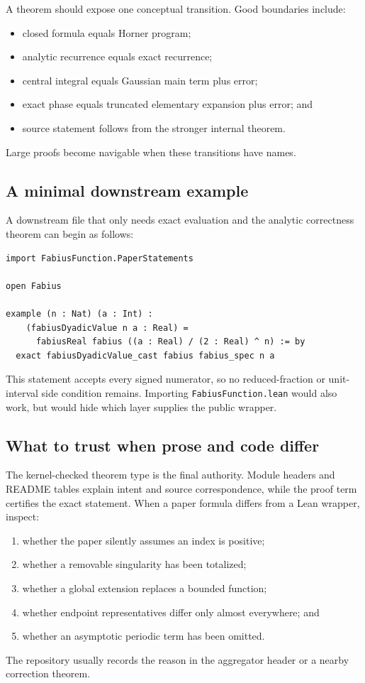 \documentclass[11pt,oneside]{article}
\theoremstyle{definition}
\theoremstyle{remark}
\begin{document}
A theorem should expose one conceptual transition.  Good boundaries include:
\begin{itemize}
  \item closed formula equals Horner program;
  \item analytic recurrence equals exact recurrence;
  \item central integral equals Gaussian main term plus error;
  \item exact phase equals truncated elementary expansion plus error; and
  \item source statement follows from the stronger internal theorem.
\end{itemize}
Large proofs become navigable when these transitions have names.

\subsection{A minimal downstream example}
A downstream file that only needs exact evaluation and the analytic correctness theorem can begin as follows:
\begin{lstlisting}[style=pseudo]
import FabiusFunction.PaperStatements

open Fabius

example (n : Nat) (a : Int) :
    (fabiusDyadicValue n a : Real) =
      fabiusReal fabius ((a : Real) / (2 : Real) ^ n) := by
  exact fabiusDyadicValue_cast fabius fabius_spec n a
\end{lstlisting}
This statement accepts every signed numerator, so no reduced-fraction or
unit-interval side condition remains.  Importing \nolinkurl{FabiusFunction.lean}
would also work, but would hide which layer supplies the public wrapper.

\subsection{What to trust when prose and code differ}
The kernel-checked theorem type is the final authority.  Module headers and README tables explain intent and source correspondence, while the proof term certifies the exact statement.  When a paper formula differs from a Lean wrapper, inspect:
\begin{enumerate}
  \item whether the paper silently assumes an index is positive;
  \item whether a removable singularity has been totalized;
  \item whether a global extension replaces a bounded function;
  \item whether endpoint representatives differ only almost everywhere; and
  \item whether an asymptotic periodic term has been omitted.
\end{enumerate}
The repository usually records the reason in the aggregator header or a nearby correction theorem.
\end{document}
